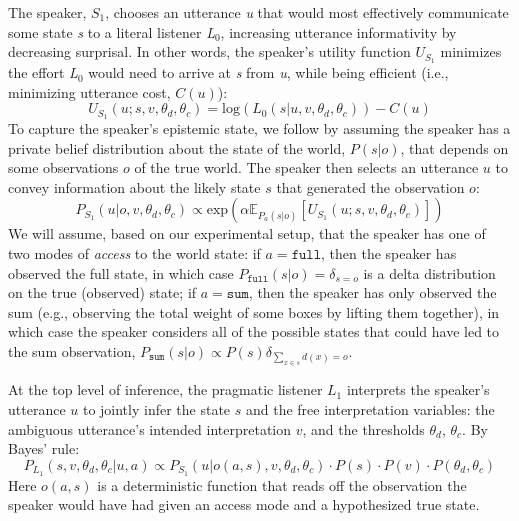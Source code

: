 \documentclass[preprint,12pt,authoryear,titlepage]{elsarticle}
\begin{document}
The speaker, $S_{1}$, chooses an utterance \emph{u} that would most effectively communicate some state \emph{s} to a literal listener \emph{L}$_{0}$, increasing utterance informativity by decreasing surprisal.  In other words, the speaker's utility function $U_{S_{1}}$ minimizes the effort \emph{L}$_{0}$ would need to arrive at \emph{s} from \emph{u}, while being efficient (i.e., minimizing utterance cost, $C(u)$):
$$U_{S_{1}}(u;s,v,\theta_d,\theta_c) = \textrm{log}(L_{0}(s|u,v,\theta_d,\theta_c)) - C(u)$$
To capture the speaker's epistemic state, we follow \cite{goodmanstuhlmuller2013} by assuming the speaker has a private belief distribution about the state of the world, $P(s|o)$, that depends on some observations $o$ of the true world. 
The speaker then selects an utterance $u$ to convey information about the likely state $s$ that generated the observation $o$:
$$P_{S_{1}} (u|o,v,\theta_d,\theta_c) \propto \textrm{exp}(\alpha \mathbb{E}_{P_a(s|o)}[U_{S_{1}} (u;s,v,\theta_d,\theta_c)])$$
We will assume, based on our experimental setup, that the speaker has one of two modes of \emph{access} to the world state: if $a=\texttt{full}$, then the speaker has observed the full state, in which case $P_{\texttt{full}}(s|o) = \delta_{s=o}$ is a delta distribution on the true (observed) state; if $a=\texttt{sum}$, then the speaker has only observed the sum (e.g., observing the total weight of some boxes by lifting them together), in which case the speaker considers all of the possible states that could have led to the sum observation, $P_{\texttt{sum}}(s|o)\propto P(s)\delta_{\sum_{x\in s} d(x) = o}$.

%


At the top level of inference, the pragmatic listener $L_{1}$ interprets the speaker's utterance $u$ to jointly infer the state $s$ and
the free interpretation variables: the ambiguous utterance's intended interpretation $v$, and the thresholds $\theta_d$, $\theta_c$. %
By Bayes' rule:
$$P_{L_{1}}(s,v,\theta_d,\theta_c|u,a) \propto P_{S_{1}}(u|o(a,s),v,\theta_d,\theta_c) \cdot P(s) \cdot P(v) \cdot P(\theta_d,\theta_c)$$
Here $o(a,s)$ is a deterministic function that reads off the observation the speaker would have had given an access mode and a hypothesized true state.
\end{document}
